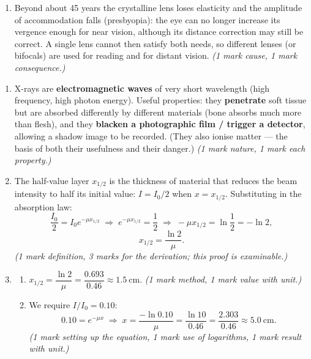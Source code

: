 \documentclass[11pt]{article}
\begin{document}
\begin{corrige}
\begin{enumerate}
\begin{enumerate}
\[ s = -0.25\ \mathrm{m}. \]
The new near point is at $25\ \mathrm{cm}$ — the normal reading distance. \emph{(1 mark method, 1 mark correct sign convention, 1 mark result.)}
\end{enumerate}
\item Beyond about 45 years the crystalline lens loses elasticity and the amplitude of accommodation falls (presbyopia): the eye can no longer increase its vergence enough for near vision, although its distance correction may still be correct. A single lens cannot then satisfy both needs, so different lenses (or bifocals) are used for reading and for distant vision. \emph{(1 mark cause, 1 mark consequence.)}
\end{enumerate}
\end{corrige}

\begin{corrige}
\begin{enumerate}
\item X-rays are \textbf{electromagnetic waves} of very short wavelength (high frequency, high photon energy). Useful properties: they \textbf{penetrate} soft tissue but are absorbed differently by different materials (bone absorbs much more than flesh), and they \textbf{blacken a photographic film / trigger a detector}, allowing a shadow image to be recorded. (They also ionise matter — the basis of both their usefulness and their danger.) \emph{(1 mark nature, 1 mark each property.)}
\item The half-value layer $x_{1/2}$ is the thickness of material that reduces the beam intensity to half its initial value: $I = I_0/2$ when $x = x_{1/2}$. Substituting in the absorption law:
\[ \frac{I_0}{2} = I_0 e^{-\mu x_{1/2}} \;\Longrightarrow\; e^{-\mu x_{1/2}} = \frac{1}{2} \;\Longrightarrow\; -\mu x_{1/2} = \ln\frac{1}{2} = -\ln 2, \]
\[ \boxed{x_{1/2} = \frac{\ln 2}{\mu}}. \]
\emph{(1 mark definition, 3 marks for the derivation; this proof is examinable.)}
\item \begin{enumerate}
\item $x_{1/2} = \dfrac{\ln 2}{\mu} = \dfrac{0.693}{0.46} \approx 1.5\ \mathrm{cm}$. \emph{(1 mark method, 1 mark value with unit.)}
\item We require $I/I_0 = 0.10$:
\[ 0.10 = e^{-\mu x} \;\Longrightarrow\; x = \frac{-\ln 0.10}{\mu} = \frac{\ln 10}{0.46} = \frac{2.303}{0.46} \approx 5.0\ \mathrm{cm}. \]
\emph{(1 mark setting up the equation, 1 mark use of logarithms, 1 mark result with unit.)}

\end{enumerate}
\end{enumerate}
\end{corrige}
\end{document}
